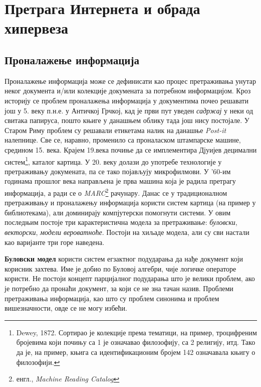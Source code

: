 \section{Претрага Интернета и обрада хипервеза}

\subsection{Проналажење информација}

Проналажење информација може се дефинисати као процес претраживања унутар неког документа и/или колекције докумената за потребном информацијом\cite{langville2011google}. Кроз историју се проблем проналажења информација у документима почео решавати још у 5. веку п.н.е. у Античкој Грчкој, кад је први пут уведен \emph{садржај} у неки од свитака папируса, пошто књиге у данашњем облику тада још нису постојале. У Старом Риму проблем су решавали етикетама налик на данашње \emph{Post-it} налепнице. Све се, наравно, променило са проналаском штампарске машине, средином 15. века. Крајем 19.века почиње да се имплементира Дјуијев децимални систем\footnote{Dewey, 1872. Сортирао је колекције према тематици, на пример, троцифреним бројевима који почињу са 1 је означавао филозофију, са 2 религију, итд. Тако да је, на пример, књига са идентификационим бројем 142 означавала књигу о филозофији.}, каталог картица. У 20. веку долази до употребе технологије у претраживању докумената, па се тако појављују микрофилмови. У '60-им годинама прошлог века направљена је прва машина која је радила претрагу информација, а ради се о \emph{MARC}\footnote{енгл., \emph{Machine Reading Catalog}} рачунару. Данас се у традиционалном претраживању и проналажењу информација користи систем картица (на пример у библиотекама), али доминирају компјутерски помогнути системи. У овим последњим постоје три карактеристична модела за претраживање: \emph{буловски}, \emph{векторски}, \emph{модели вероватноће}\cite[Ch 1.2]{langville2011google}. Постоји на хиљаде модела, али су сви настали као варијанте три горе наведена.

\textbf{Буловски модел} користи систем егзактног подударања да нађе документ који корисник захтева. Име је добио по Буловој алгебри, чије логичке операторе користи. Не постоји концепт парцијалног подударања што је велики проблем, ако је потребно да пронаћи документ, за који се не зна тачан назив. Проблеми претраживања информација, као што су проблем синонима и проблем вишезначности, овде се не могу избећи.

